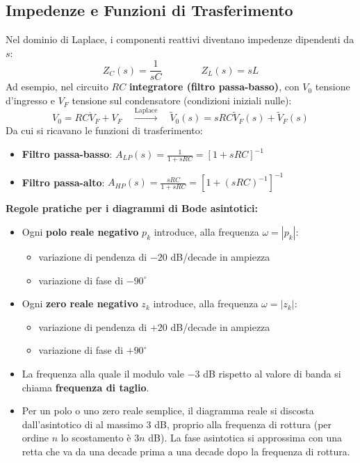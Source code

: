 \subsection*{Impedenze e Funzioni di Trasferimento}
Nel dominio di Laplace, i componenti reattivi diventano impedenze dipendenti da $s$:
\[
    Z_C(s) = \frac{1}{sC} \qquad \qquad Z_L(s) = sL
\]
Ad esempio, nel circuito $RC$ \textbf{integratore (filtro passa-basso)}, con $V_0$ tensione d'ingresso e $V_F$ tensione sul condensatore (condizioni iniziali nulle):
\[
    V_0 = RC \dot{V}_F + V_F \quad \xrightarrow{\text{Laplace}} \quad \tilde{V}_0(s) = sRC \tilde{V}_F(s) + \tilde{V}_F(s)
\]
Da cui si ricavano le funzioni di trasferimento:
\begin{itemize}
    \item \textbf{Filtro passa-basso}: $A_{LP}(s) = \frac{1}{1+sRC} = \left[ 1 + sRC \right]^{-1}$
    \item \textbf{Filtro passa-alto}: $A_{HP}(s) = \frac{sRC}{1+sRC} = \left[ 1 + (sRC)^{-1} \right]^{-1}$
\end{itemize}

\begin{note}
\textbf{Regole pratiche per i diagrammi di Bode asintotici:}
\begin{itemize}
    \item Ogni \textbf{polo reale negativo} $p_k$ introduce, alla frequenza $\omega = |p_k|$:
        \begin{itemize}
            \item variazione di pendenza di $-20$ dB/decade in ampiezza
            \item variazione di fase di $-90^\circ$
        \end{itemize}
    \item Ogni \textbf{zero reale negativo} $z_k$ introduce, alla frequenza $\omega = |z_k|$:
        \begin{itemize}
            \item variazione di pendenza di $+20$ dB/decade in ampiezza
            \item variazione di fase di $+90^\circ$
        \end{itemize}
    \item La frequenza alla quale il modulo vale $-3$ dB rispetto al valore di banda si chiama \textbf{frequenza di taglio}.
    \item Per un polo o uno zero reale semplice, il diagramma reale si discosta dall'asintotico di al massimo $3$ dB, proprio alla frequenza di rottura (per ordine $n$ lo scostamento è $3n$ dB). La fase asintotica si approssima con una retta che va da una decade prima a una decade dopo la frequenza di rottura.
\end{itemize}
\end{note}

\clearpage

